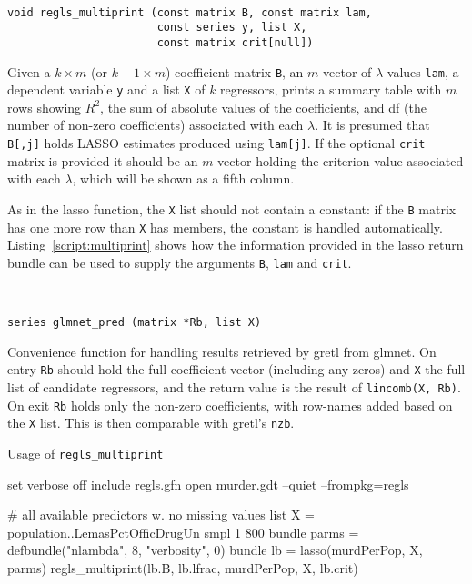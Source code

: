 \documentclass{article}
\newenvironment{funcdoc}
{\noindent\hrulefill\\[-12pt]}
{\medbreak}
\begin{document}
\begin{funcdoc}
\begin{verbatim}
void regls_multiprint (const matrix B, const matrix lam,
                       const series y, list X,
                       const matrix crit[null])
\end{verbatim}
  Given a $k \times m$ (or $k+1 \times m$) coefficient matrix
  \texttt{B}, an $m$-vector of $\lambda$ values \texttt{lam}, a
  dependent variable \texttt{y} and a list \texttt{X} of $k$
  regressors, prints a summary table with $m$ rows showing $R^2$, the
  sum of absolute values of the coefficients, and df (the number of
  non-zero coefficients) associated with each $\lambda$. It is
  presumed that \texttt{B[,j]} holds LASSO estimates produced using
  \texttt{lam[j]}. If the optional \texttt{crit} matrix is provided it
  should be an $m$-vector holding the criterion value associated with
  each $\lambda$, which will be shown as a fifth column.

  As in the lasso function, the \texttt{X} list should not contain a
  constant: if the \texttt{B} matrix has one more row than \texttt{X}
  has members, the constant is handled
  automatically. Listing~\ref{script:multiprint} shows how the
  information provided in the lasso return bundle can be used to
  supply the arguments \texttt{B}, \texttt{lam} and \texttt{crit}.
\end{funcdoc}

\begin{funcdoc}
\begin{verbatim}
series glmnet_pred (matrix *Rb, list X)
\end{verbatim}
  Convenience function for handling results retrieved by gretl from
  \textsf{glmnet}. On entry \texttt{Rb} should hold the full
  coefficient vector (including any zeros) and \texttt{X} the full
  list of candidate regressors, and the return value is the result of
  \texttt{lincomb(X, Rb)}. On exit \texttt{Rb} holds only the non-zero
  coefficients, with row-names added based on the \texttt{X}
  list. This is then comparable with gretl's \texttt{nzb}.
\end{funcdoc}

\begin{script}
  \caption{Usage of \texttt{regls\_multiprint}}
  \label{script:multiprint}
\begin{scode}
set verbose off
include regls.gfn
open murder.gdt --quiet --frompkg=regls

# all available predictors w. no missing values
list X = population..LemasPctOfficDrugUn
smpl 1 800
bundle parms = defbundle("nlambda", 8, "verbosity", 0)
bundle lb = lasso(murdPerPop, X, parms)
regls_multiprint(lb.B, lb.lfrac, murdPerPop, X, lb.crit)
\end{scode}
  \end{script}
\end{document}
